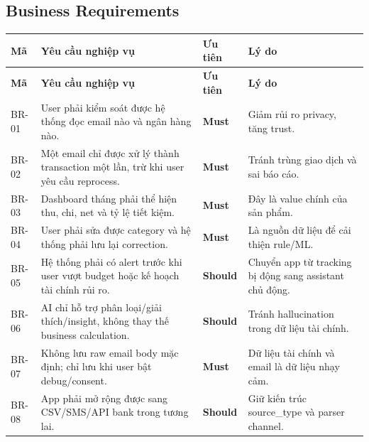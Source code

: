 \documentclass[11pt,a4paper]{article}
\renewcommand{\thead}[1]{\textbf{\color{PrimaryDark}#1}}
\newcommand{\badge}[2]{\begingroup\setlength{\fboxsep}{2pt}\colorbox{#1!12}{\textcolor{#1}{\scriptsize\textbf{#2}}}\endgroup}
\newenvironment{tableblock}{\Needspace{8\baselineskip}\vspace{0.25em}}{\vspace{0.75em}}
\begin{document}
\subsection{Business Requirements}
\begin{tableblock}
\scriptsize
\begin{longtable}{L{1.6cm}L{7.1cm}L{1.9cm}L{4.9cm}}
\thead{Mã} & \thead{Yêu cầu nghiệp vụ} & \thead{Ưu tiên} & \thead{Lý do} \\
\endfirsthead
{}\thead{Mã} & \thead{Yêu cầu nghiệp vụ} & \thead{Ưu tiên} & \thead{Lý do} \\
\endhead
BR-01 & User phải kiểm soát được hệ thống đọc email nào và ngân hàng nào. & \badge{PriorityP0}{Must} & Giảm rủi ro privacy, tăng trust. \\
BR-02 & Một email chỉ được xử lý thành transaction một lần, trừ khi user yêu cầu reprocess. & \badge{PriorityP0}{Must} & Tránh trùng giao dịch và sai báo cáo. \\
BR-03 & Dashboard tháng phải thể hiện thu, chi, net và tỷ lệ tiết kiệm. & \badge{PriorityP0}{Must} & Đây là value chính của sản phẩm. \\
BR-04 & User phải sửa được category và hệ thống phải lưu lại correction. & \badge{PriorityP0}{Must} & Là nguồn dữ liệu để cải thiện rule/ML. \\
BR-05 & Hệ thống phải có alert trước khi user vượt budget hoặc kế hoạch tài chính rủi ro. & \badge{PriorityP1}{Should} & Chuyển app từ tracking bị động sang assistant chủ động. \\
BR-06 & AI chỉ hỗ trợ phân loại/giải thích/insight, không thay thế business calculation. & \badge{PriorityP1}{Should} & Tránh hallucination trong dữ liệu tài chính. \\
BR-07 & Không lưu raw email body mặc định; chỉ lưu khi user bật debug/consent. & \badge{PriorityP0}{Must} & Dữ liệu tài chính và email là dữ liệu nhạy cảm. \\
BR-08 & App phải mở rộng được sang CSV/SMS/API bank trong tương lai. & \badge{PriorityP1}{Should} & Giữ kiến trúc source\_type và parser channel. \\
\end{longtable}
\end{tableblock}
\end{document}
